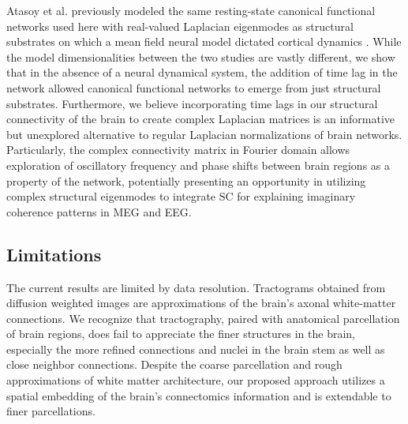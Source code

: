 \documentclass{article}
\begin{document}
Atasoy et al. previously modeled the same resting-state canonical functional networks used here with real-valued Laplacian eigenmodes as structural substrates on which a mean field neural model dictated cortical dynamics \cite{Atasoy2016}. While the model dimensionalities between the two studies are vastly different, we show that in the absence of a neural dynamical system, the addition of time lag in the network allowed canonical functional networks to emerge from just structural substrates. Furthermore, we believe incorporating time lags in our structural connectivity of the brain to create complex Laplacian matrices is an informative but unexplored alternative to regular Laplacian normalizations of brain networks. Particularly, the complex connectivity matrix in Fourier domain allows exploration of oscillatory frequency and phase shifts between brain regions as a property of the network, potentially presenting an opportunity in utilizing complex structural eigenmodes to integrate SC for explaining imaginary coherence patterns in MEG and EEG. 


\subsection{Limitations}
The current results are limited by data resolution. Tractograms obtained from diffusion weighted images are approximations of the brain's axonal white-matter connections. We recognize that tractography, paired with anatomical parcellation of brain regions, does fail to appreciate the finer structures in the brain, especially the more refined connections and nuclei in the brain stem as well as close neighbor connections. Despite the coarse parcellation and rough approximations of white matter architecture, our proposed approach utilizes a spatial embedding of the brain's connectomics information and is extendable to finer parcellations. 
\end{document}
